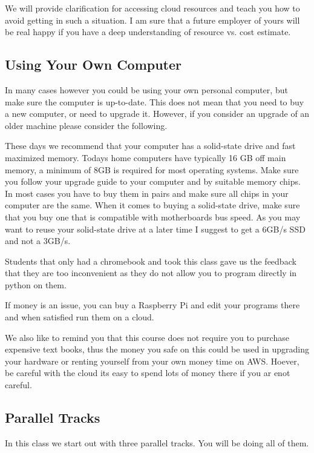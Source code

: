 We will provide clarification for accessing cloud resources and teach
you how to avoid getting in such a situation. I am sure that a future
employer of yours will be real happy if you have a deep understanding of
resource vs. cost estimate.

\subsection{Using Your Own Computer}\label{using-your-own-computer}

In many cases however you could be using your own personal computer, but
make sure the computer is up-to-date. This does not mean that you need
to buy a new computer, or need to upgrade it. However, if you consider
an upgrade of an older machine please consider the following.

These days we recommend that your computer has a solid-state drive and
fast maximized memory. Todays home computers have typically 16 GB off
main memory, a minimum of 8GB is required for most operating systems.
Make sure you follow your upgrade guide to your computer and by suitable
memory chips. In most cases you have to buy them in pairs and make sure
all chips in your computer are the same. When it comes to buying a
solid-state drive, make sure that you buy one that is compatible with
motherboards bus speed. As you may want to reuse your solid-state drive
at a later time I suggest to get a 6GB/s SSD and not a 3GB/s.

Students that only had a chromebook and took this class gave us the
feedback that they are too inconvenient as they do not allow you to
program directly in python on them.

If money is an issue, you can buy a Raspberry Pi and edit your programs
there and when satisfied run them on a cloud.

We also like to remind you that this course does not require you to
purchase expensive text books, thus the money you safe on this could be
used in upgrading your hardware or renting yourself from your own money
time on AWS. Hoever, be careful with the cloud its easy to spend lots of
money there if you ar enot careful.

\subsection{Parallel Tracks}\label{parallel-tracks}

In this class we start out with three parallel tracks. You will be doing
all of them.

